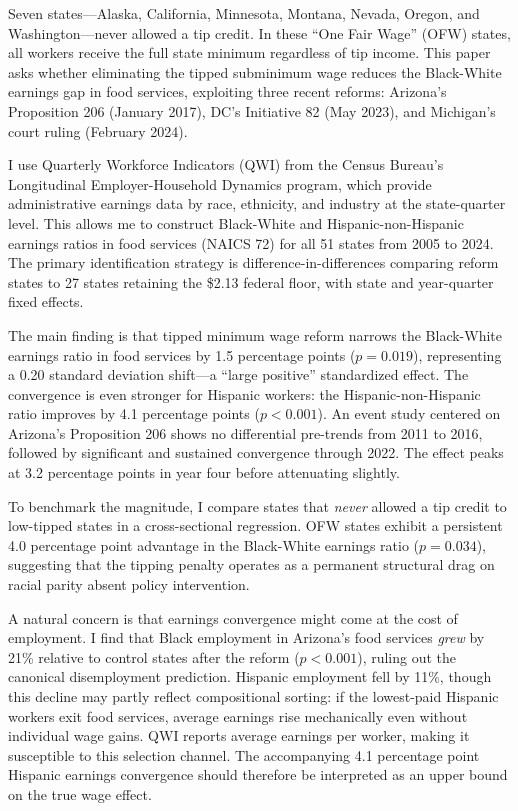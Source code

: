 \documentclass[12pt]{article}
\begin{document}
Seven states---Alaska, California, Minnesota, Montana, Nevada, Oregon, and Washington---never allowed a tip credit. In these ``One Fair Wage'' (OFW) states, all workers receive the full state minimum regardless of tip income. This paper asks whether eliminating the tipped subminimum wage reduces the Black-White earnings gap in food services, exploiting three recent reforms: Arizona's Proposition 206 (January 2017), DC's Initiative 82 (May 2023), and Michigan's court ruling (February 2024).

I use Quarterly Workforce Indicators (QWI) from the Census Bureau's Longitudinal Employer-Household Dynamics program, which provide administrative earnings data by race, ethnicity, and industry at the state-quarter level. This allows me to construct Black-White and Hispanic-non-Hispanic earnings ratios in food services (NAICS 72) for all 51 states from 2005 to 2024. The primary identification strategy is difference-in-differences comparing reform states to 27 states retaining the \$2.13 federal floor, with state and year-quarter fixed effects.

The main finding is that tipped minimum wage reform narrows the Black-White earnings ratio in food services by 1.5 percentage points ($p = 0.019$), representing a 0.20 standard deviation shift---a ``large positive'' standardized effect. The convergence is even stronger for Hispanic workers: the Hispanic-non-Hispanic ratio improves by 4.1 percentage points ($p < 0.001$). An event study centered on Arizona's Proposition 206 shows no differential pre-trends from 2011 to 2016, followed by significant and sustained convergence through 2022. The effect peaks at 3.2 percentage points in year four before attenuating slightly.

To benchmark the magnitude, I compare states that \textit{never} allowed a tip credit to low-tipped states in a cross-sectional regression. OFW states exhibit a persistent 4.0 percentage point advantage in the Black-White earnings ratio ($p = 0.034$), suggesting that the tipping penalty operates as a permanent structural drag on racial parity absent policy intervention.

A natural concern is that earnings convergence might come at the cost of employment. I find that Black employment in Arizona's food services \textit{grew} by 21\% relative to control states after the reform ($p < 0.001$), ruling out the canonical disemployment prediction. Hispanic employment fell by 11\%, though this decline may partly reflect compositional sorting: if the lowest-paid Hispanic workers exit food services, average earnings rise mechanically even without individual wage gains. QWI reports average earnings per worker, making it susceptible to this selection channel. The accompanying 4.1 percentage point Hispanic earnings convergence should therefore be interpreted as an upper bound on the true wage effect.
\end{document}
